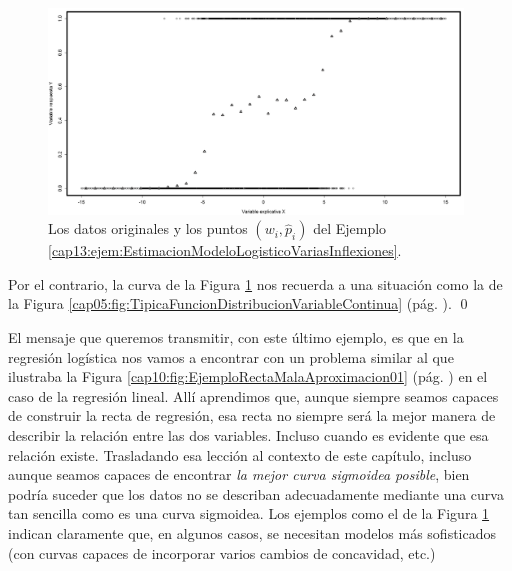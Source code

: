 \begin{ejemplo}
\begin{figure}[h!]
\begin{center}
\begin{enColor}
\end{enColor}
\begin{bn}
    \includegraphics[width=11cm]{../fig/Cap13-EstimacionModeloLogisticoVariasInflexiones-bn.png}
\end{bn}
\caption{Los datos originales y los puntos $(w_i, \hat p_i)$ del Ejemplo \ref{cap13:ejem:EstimacionModeloLogisticoVariasInflexiones}. }
\label{cap13:fig:ModeloLogisticoVariasInflexiones}
\end{center}
\end{figure}

Por el contrario, la curva de la Figura \ref{cap13:fig:ModeloLogisticoVariasInflexiones} nos recuerda a una situación como la de la Figura \ref{cap05:fig:TipicaFuncionDistribucionVariableContinua} (pág. \pageref{cap05:fig:TipicaFuncionDistribucionVariableContinua}).
\qed
\end{ejemplo}

\noindent El mensaje que queremos transmitir, con este último ejemplo, es que en la regresión logística nos vamos a encontrar con un problema similar al que ilustraba la Figura \ref{cap10:fig:EjemploRectaMalaAproximacion01} (pág. \pageref{cap10:fig:EjemploRectaMalaAproximacion01}) en el caso de la regresión lineal. Allí aprendimos que, aunque siempre seamos capaces de construir la recta de regresión, esa recta no siempre será la mejor manera de describir la relación entre las dos variables. Incluso cuando es evidente que esa relación existe. Trasladando esa lección al contexto de este capítulo, incluso aunque seamos capaces de encontrar {\em la mejor curva sigmoidea posible}, bien podría suceder que los datos no se describan adecuadamente mediante una curva tan sencilla como es una curva sigmoidea. Los ejemplos como el de la Figura \ref{cap13:fig:ModeloLogisticoVariasInflexiones} indican claramente que, en algunos casos, se necesitan modelos más sofisticados (con curvas capaces de incorporar varios cambios de concavidad, etc.)\\

